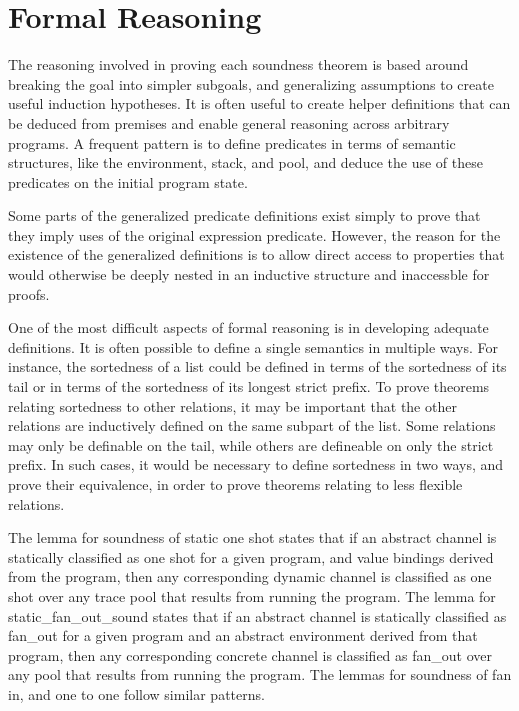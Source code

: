 \documentclass{article}
\begin{document}
\section{Formal Reasoning}
The reasoning involved in proving each soundness theorem is based around breaking the
goal into simpler subgoals, and generalizing assumptions to create useful induction
hypotheses.  It is often useful to create helper definitions that can be deduced from premises
and enable general reasoning across arbitrary programs. A frequent pattern is to define
predicates in terms of semantic structures, like the environment, stack, and pool, and deduce 
the use of these predicates on the initial program state. 

Some parts of the generalized predicate definitions exist simply to prove that they imply uses
of the original expression predicate. However, the reason for the existence of the generalized
definitions is to allow direct access to properties that would otherwise be deeply nested in an
inductive structure and inaccessble for proofs.

One of the most difficult aspects of formal reasoning is in developing adequate definitions.
It is often possible to define a single semantics in multiple ways.
For instance, the sortedness of a list could be defined in terms of the sortedness of its tail
or in terms of the sortedness of its longest strict prefix.  To prove theorems relating
sortedness to other relations, it may be important that the other relations are inductively
defined on the same subpart of the list.  Some relations may only be definable on the tail,
while others are defineable on only the strict prefix.  In such cases, it would be necessary to
define sortedness in two ways, and prove their equivalence, in order to prove theorems relating
to less flexible relations.


The lemma for soundness of static one shot states that if an abstract channel is statically
classified as one shot for a given program, and value bindings derived from the program, then
any corresponding dynamic channel is classified as one shot over any trace pool that results
from running the program.  The lemma for static\_fan\_out\_sound states that if an abstract
channel is statically classified as fan\_out for a given program and an abstract environment
derived from that program, then any corresponding concrete channel is classified as fan\_out
over any pool that results from running the program.  The lemmas for soundness of fan in, and
one to one follow similar patterns. 
\end{document}

